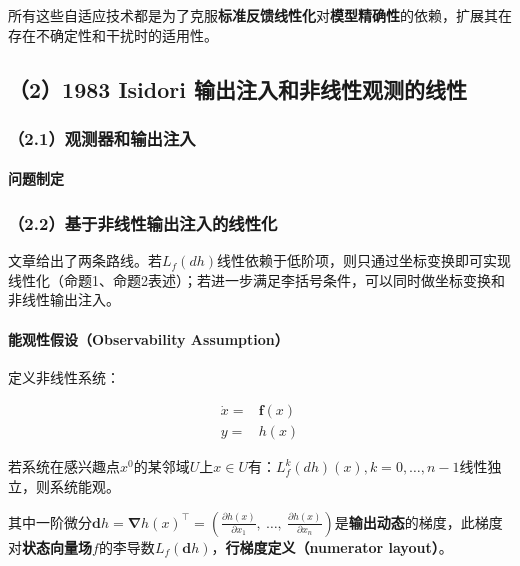 \documentclass[
  12pt,
  a4paper
]{article}
\begin{document}
所有这些自适应技术都是为了克服\textbf{标准反馈线性化}对\textbf{模型精确性}的依赖，扩展其在存在不确定性和干扰时的适用性。

\subsection{（2）1983 Isidori
输出注入和非线性观测的线性}\label{isidori-ux8f93ux51faux6ce8ux5165ux548cux975eux7ebfux6027ux89c2ux6d4bux7684ux7ebfux6027}

\subsubsection{（2.1）观测器和输出注入}\label{ux89c2ux6d4bux5668ux548cux8f93ux51faux6ce8ux5165}

\paragraph{问题制定}\label{ux95eeux9898ux5236ux5b9a}

\subsubsection{（2.2）基于非线性输出注入的线性化}\label{ux57faux4e8eux975eux7ebfux6027ux8f93ux51faux6ce8ux5165ux7684ux7ebfux6027ux5316}

文章给出了两条路线。若\(L_{f}(dh)\)线性依赖于低阶项，则只通过坐标变换即可实现线性化（命题1、命题2表述）；若进一步满足李括号条件，可以同时做坐标变换和非线性输出注入。

\paragraph{能观性假设（Observability
Assumption）}\label{ux80fdux89c2ux6027ux5047ux8bbeobservability-assumption}

定义非线性系统：

\[\begin{aligned}
\dot{x} = & \mathbf{f}(x) \\
y = & h(x)
\end{aligned}\]

若系统在感兴趣点\(x^{0}\)的某邻域\(U\)上\(x \in U\)有：\(L_{f}^{k}(dh)(x),k = 0,\ldots,n - 1\)线性独立，则系统能观。

其中一阶微分\(\mathbf{d}h = \mathbf{\nabla}h(x)^{\top} = \left( \frac{\partial h(x)}{\partial x_{1}},\ \ldots,\ \frac{\partial h(x)}{\partial x_{n}} \right)\)是\textbf{输出动态}的梯度，此梯度对\textbf{状态向量场}\(f\)的李导数\(L_{f}(\mathbf{d}h)\)，\textbf{行梯度定义（numerator
layout）}。
\end{document}
